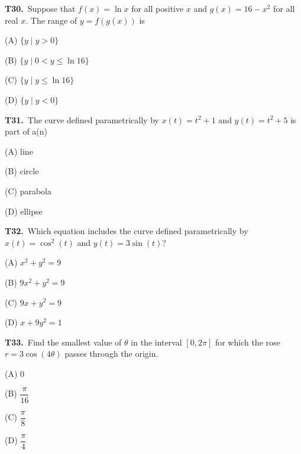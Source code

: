 \documentclass[11pt]{article}
\begin{document}
\bigskip\noindent\textbf{T30.}\ Suppose that $f(x) = \ln x$ for all positive $x$ and $g(x) = 16 - x^2$ for all real $x$. The range of $y = f(g(x))$ is
\begin{list}{}{\setlength{\leftmargin}{3em}\setlength{\labelwidth}{2.5em}\setlength{\itemsep}{0pt}\setlength{\topsep}{2pt}}
\item[(A)] $\{y \mid y > 0\}$
\item[(B)] $\{y \mid 0 < y \leq \ln 16\}$
\item[(C)] $\{y \mid y \leq \ln 16\}$
\item[(D)] $\{y \mid y < 0\}$
\end{list}

\bigskip\noindent\textbf{T31.}\ The curve defined parametrically by $x(t) = t^2 + 1$ and $y(t) = t^2 + 5$ is part of a(n)
\begin{list}{}{\setlength{\leftmargin}{3em}\setlength{\labelwidth}{2.5em}\setlength{\itemsep}{0pt}\setlength{\topsep}{2pt}}
\item[(A)] line
\item[(B)] circle
\item[(C)] parabola
\item[(D)] ellipse
\end{list}

\bigskip\noindent\textbf{T32.}\ Which equation includes the curve defined parametrically by $x(t) = \cos^2(t)$ and $y(t) = 3\sin(t)$?
\begin{list}{}{\setlength{\leftmargin}{3em}\setlength{\labelwidth}{2.5em}\setlength{\itemsep}{0pt}\setlength{\topsep}{2pt}}
\item[(A)] $x^2 + y^2 = 9$
\item[(B)] $9x^2 + y^2 = 9$
\item[(C)] $9x + y^2 = 9$
\item[(D)] $x + 9y^2 = 1$
\end{list}

\bigskip\noindent\textbf{T33.}\ Find the smallest value of $\theta$ in the interval $[0, 2\pi]$ for which the rose $r = 3\cos(4\theta)$ passes through the origin.
\begin{list}{}{\setlength{\leftmargin}{3em}\setlength{\labelwidth}{2.5em}\setlength{\itemsep}{0pt}\setlength{\topsep}{2pt}}
\item[(A)] $0$
\item[(B)] $\dfrac{\pi}{16}$
\item[(C)] $\dfrac{\pi}{8}$
\item[(D)] $\dfrac{\pi}{4}$
\end{list}
\end{document}

